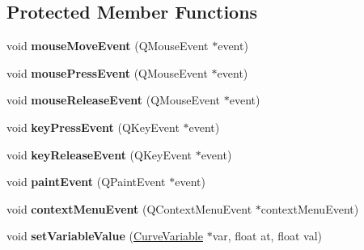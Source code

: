 \subsection*{\-Protected \-Member \-Functions}
\begin{DoxyCompactItemize}
\item 
\hypertarget{class_cube_map_preview_afd803da253f7abc11d45508ba958fdfa}{
void {\bfseries mouse\-Move\-Event} (\-Q\-Mouse\-Event $\ast$event)}
\label{class_cube_map_preview_afd803da253f7abc11d45508ba958fdfa}

\item 
\hypertarget{class_cube_map_preview_a3148cc7d4d05fbce02793701e6cc9f06}{
void {\bfseries mouse\-Press\-Event} (\-Q\-Mouse\-Event $\ast$event)}
\label{class_cube_map_preview_a3148cc7d4d05fbce02793701e6cc9f06}

\item 
\hypertarget{class_cube_map_preview_a6f3d8e7c794f11ee0ba717d0eefc68fc}{
void {\bfseries mouse\-Release\-Event} (\-Q\-Mouse\-Event $\ast$event)}
\label{class_cube_map_preview_a6f3d8e7c794f11ee0ba717d0eefc68fc}

\item 
\hypertarget{class_cube_map_preview_a59c8580bab9beae4d22ace0a35a24afc}{
void {\bfseries key\-Press\-Event} (\-Q\-Key\-Event $\ast$event)}
\label{class_cube_map_preview_a59c8580bab9beae4d22ace0a35a24afc}

\item 
\hypertarget{class_cube_map_preview_af67f0c8cdfbd866ec52457cfa600e69d}{
void {\bfseries key\-Release\-Event} (\-Q\-Key\-Event $\ast$event)}
\label{class_cube_map_preview_af67f0c8cdfbd866ec52457cfa600e69d}

\item 
\hypertarget{class_cube_map_preview_aefb7fc28c9c9babe1841fbb78ce202a4}{
void {\bfseries paint\-Event} (\-Q\-Paint\-Event $\ast$event)}
\label{class_cube_map_preview_aefb7fc28c9c9babe1841fbb78ce202a4}

\item 
\hypertarget{class_cube_map_preview_a903b32fc0dfc839b9dfacc9008883b31}{
void {\bfseries context\-Menu\-Event} (\-Q\-Context\-Menu\-Event $\ast$context\-Menu\-Event)}
\label{class_cube_map_preview_a903b32fc0dfc839b9dfacc9008883b31}

\item 
\hypertarget{class_cube_map_preview_ad70db71bdf15c5f74a1e0741b1e4b208}{
void {\bfseries set\-Variable\-Value} (\hyperlink{class_curve_variable}{\-Curve\-Variable} $\ast$var, float at, float val)}
\label{class_cube_map_preview_ad70db71bdf15c5f74a1e0741b1e4b208}

\end{DoxyCompactItemize}
